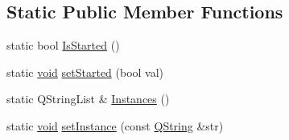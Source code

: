 \subsection*{\-Static \-Public \-Member \-Functions}
\begin{DoxyCompactItemize}
\item 
static bool \hyperlink{group___mo_cap_plugin_ga4b693d27267a22d345082b85e2ebe71e}{\-Is\-Started} ()
\item 
static \hyperlink{group___u_a_v_objects_plugin_ga444cf2ff3f0ecbe028adce838d373f5c}{void} \hyperlink{group___mo_cap_plugin_ga7b3b24d7f35ac822cf8414afbf88854d}{set\-Started} (bool val)
\item 
static \-Q\-String\-List \& \hyperlink{group___mo_cap_plugin_ga31d137dece30e0f249c4162df4b5b105}{\-Instances} ()
\item 
static \hyperlink{group___u_a_v_objects_plugin_ga444cf2ff3f0ecbe028adce838d373f5c}{void} \hyperlink{group___mo_cap_plugin_ga8a5fd7b06f55301b2683b72e15ffdd1e}{set\-Instance} (const \hyperlink{group___u_a_v_objects_plugin_gab9d252f49c333c94a72f97ce3105a32d}{\-Q\-String} \&str)
\end{DoxyCompactItemize}
